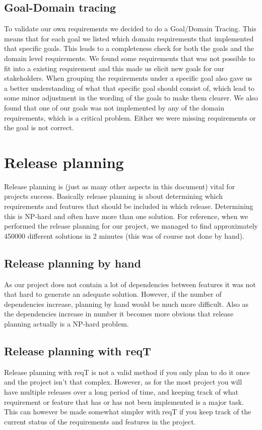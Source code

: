 \documentclass[a4paper]{article}
\begin{document}
			\subsection{Goal-Domain tracing}
				To validate our own requirements we decided to do a Goal/Domain Tracing. This means that for each goal we listed which domain requirements that implemented that specific goals. This leads to a completeness check for both the goals and the domain level requirements. We found some requirements that was not possible to fit into a existing requirement and this made us elicit new goals for our stakeholders. When grouping the requirements under a specific goal also gave us a better understanding of what that specific goal should consist of, which lead to some minor adjustment in the wording of the goals to make them clearer. We also found that one of our goals was not implemented by any of the domain requirements, which is a critical problem. Either we were missing requirements or the goal is not correct. 

	\section{Release planning}
		Release planning is (just as many other aspects in this document) vital for projects success. Basically release planning is about determining which requirements and features that should be included in which release. Determining this is NP-hard and often have more than one solution. For reference, when we performed the release planning for our project, we managed to find approximately 450000 different solutions in 2 minutes (this was of course not done by hand).

		\subsection{Release planning by hand}
			As our project does not contain a lot of dependencies between features it was not that hard to generate an adequate solution. However, if the number of dependencies increase, planning by hand would be much more difficult. Also as the dependencies increase in number it becomes more obvious that release planning actually is a NP-hard problem.

		\subsection{Release planning with reqT}
			Release planning with reqT is not a valid method if you only plan to do it once and the project isn't that complex. However, as for the most project you will have multiple releases over a long period of time, and keeping track of what requirement or feature that has or has not been implemented is a major task. This can however be made somewhat simpler with reqT if you keep track of the current status of the requirements and features in the project.
\end{document}
